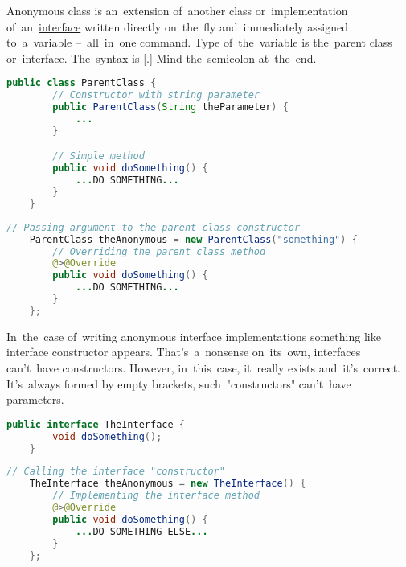 \label{javaanonymousclass}
Anonymous class is an~extension of~another class or~implementation of~an~\hyperref[javainterfaces]{interface} written directly on~the~fly and~immediately assigned to~a~variable --~all~in~one command.
Type of~the~variable is the~parent class or~interface.
The~syntax is [.]
Mind the~semicolon at~the~end.

\begin{lstlisting}[language=Java, title={A simple class}]
    public class ParentClass {
        // Constructor with string parameter
        public ParentClass(String theParameter) {
            ...
        }

        // Simple method
        public void doSomething() {
            ...DO SOMETHING...
        }
    }
\end{lstlisting}
\newpage

\begin{lstlisting}[language=Java, title={Anonymous extension of the simple class}]
    // Passing argument to the parent class constructor
    ParentClass theAnonymous = new ParentClass("something") {
        // Overriding the parent class method
        @>@Override
        public void doSomething() {
            ...DO SOMETHING...
        }
    };
\end{lstlisting}

\warning In~the~case of~writing anonymous interface implementations something like interface constructor appears.
That's~a~nonsense on~its~own, interfaces can't~have constructors.
However, in~this~case, it~really exists and~it's~correct.
It's~always formed by empty brackets, such~"constructors" can't~have parameters.

\begin{lstlisting}[language=Java, title={A simple interface}]
    public interface TheInterface {
        void doSomething();
    }
\end{lstlisting}
\begin{lstlisting}[language=Java, title={Anonymous implementation of the interface}]
    // Calling the interface "constructor"
    TheInterface theAnonymous = new TheInterface() {
        // Implementing the interface method
        @>@Override
        public void doSomething() {
            ...DO SOMETHING ELSE...
        }
    };
\end{lstlisting}
\newline

